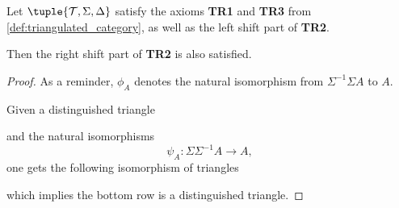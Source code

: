 \begin{lemma}
    Let \( \tuple{ \Tc, \Sigma, \Delta } \) satisfy the axioms {\bf TR1} and {\bf TR3} from \autoref{def:triangulated_category}, as well as the left shift part of {\bf TR2}.

    Then the right shift part of {\bf TR2} is also satisfied.
\end{lemma}
\begin{proof}
    As a reminder, \( \phi_A \) denotes the natural isomorphism from \( \Sigma^{-1} \Sigma A \) to \( A \).

    Given a distinguished triangle
    \begin{center}
    \end{center}
    and the natural isomorphisms
    \[
        \psi_A: \Sigma \Sigma^{-1} A \to A,
    \]
    one gets the following isomorphism of triangles
    \begin{center}
    \end{center}
    which implies the bottom row is a distinguished triangle.


\end{proof}
